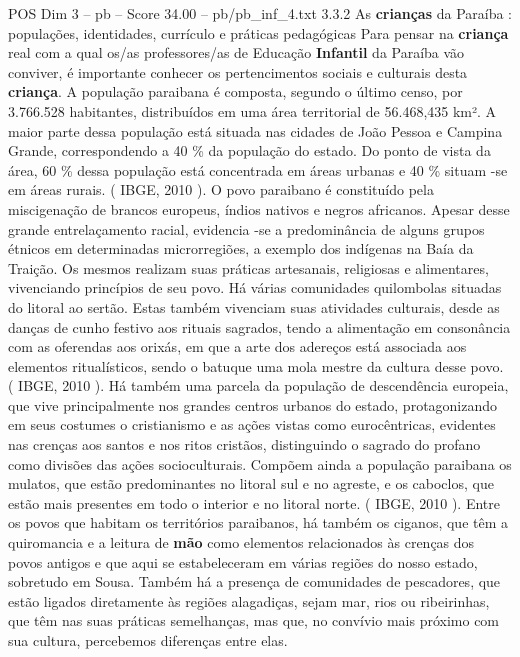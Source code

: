 \begin{textsample}{POS Dim 3 – pb – Score 34.00 – pb/pb\_inf\_4.txt}  \label{ex:f3_pos_081}
3.3.2 As \textbf{crianças} da Paraíba : populações, identidades, currículo e práticas pedagógicas Para pensar na \textbf{criança} real com a qual os/as professores/as de Educação \textbf{Infantil} da Paraíba vão conviver, é importante conhecer os pertencimentos sociais e culturais desta \textbf{criança}.
A população paraibana é composta, segundo o último censo, por 3.766.528 habitantes, distribuídos em uma área territorial de 56.468,435 km².
A maior parte dessa população está situada nas cidades de João Pessoa e Campina Grande, correspondendo a 40 \% da população do estado.
Do ponto de vista da área, 60 \% dessa população está concentrada em áreas urbanas e 40 \% situam -se em áreas rurais. ( IBGE, 2010 ).
O povo paraibano é constituído pela miscigenação de brancos europeus, índios nativos e negros africanos.
Apesar desse grande entrelaçamento racial, evidencia -se a predominância de alguns grupos étnicos em determinadas microrregiões, a exemplo dos indígenas na Baía da Traição.
Os mesmos realizam suas práticas artesanais, religiosas e alimentares, vivenciando princípios de seu povo.
Há várias comunidades quilombolas situadas do litoral ao sertão.
Estas também vivenciam suas atividades culturais, desde as danças de cunho festivo aos rituais sagrados, tendo a alimentação em consonância com as oferendas aos orixás, em que a arte dos adereços está associada aos elementos ritualísticos, sendo o batuque uma mola mestre da cultura desse povo. ( IBGE, 2010 ).
Há também uma parcela da população de descendência europeia, que vive principalmente nos grandes centros urbanos do estado, protagonizando em seus costumes o cristianismo e as ações vistas como eurocêntricas, evidentes nas crenças aos santos e nos ritos cristãos, distinguindo o sagrado do profano como divisões das ações socioculturais.
Compõem ainda a população paraibana os mulatos, que estão predominantes no litoral sul e no agreste, e os caboclos, que estão mais presentes em todo o interior e no litoral norte. ( IBGE, 2010 ).
Entre os povos que habitam os territórios paraibanos, há também os ciganos, que têm a quiromancia e a leitura de \textbf{mão} como elementos relacionados às crenças dos povos antigos e que aqui se estabeleceram em várias regiões do nosso estado, sobretudo em Sousa.
Também há a presença de comunidades de pescadores, que estão ligados diretamente às regiões alagadiças, sejam mar, rios ou ribeirinhas, que têm nas suas práticas semelhanças, mas que, no convívio mais próximo com sua cultura, percebemos diferenças entre elas.

\end{textsample}

